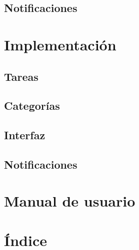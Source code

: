 \documentclass[parskip=half*]{scrartcl}
\begin{document}
\subsection{Notificaciones}


\section{Implementación}

\subsection{Tareas}

\subsection{Categorías}

\subsection{Interfaz}

\subsection{Notificaciones}


\section{Manual de usuario}


\section{Índice}

\printindex
\end{document}
